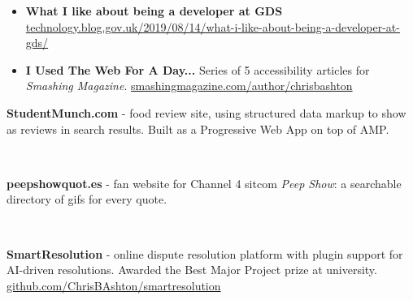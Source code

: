 \documentclass[10pt,a4paper,ragged2e,withhyper]{altacv}
\begin{document}
\begin{paracol}{2}
\vspace{\publicationspacer}
\begin{itemize}
    \item \textbf{What I like about being a developer at GDS} \newline \href{https://technology.blog.gov.uk/2019/08/14/what-i-like-about-being-a-developer-at-gds/}{\url{technology.blog.gov.uk/2019/08/14/what-i-like-about-being-a-developer-at-gds/}}

    \item \textbf{I Used The Web For A Day...}
    \newline Series of 5 accessibility articles for \emph{Smashing Magazine}.
    \newline
    \href{https://www.smashingmagazine.com/author/chrisbashton/}{\url{smashingmagazine.com/author/chrisbashton}}
\end{itemize}

\newpage


\def\spacer{0.7cm}

\textbf{StudentMunch.com} - food review site, using structured data markup to show as reviews in search results. Built as a Progressive Web App on top of AMP.

\medskip

  \\

\vspace{\spacer}

\textbf{peepshowquot.es} - fan website for Channel 4 sitcom \emph{Peep Show}: a searchable directory of gifs for every quote.

\medskip

  \\

\vspace{\spacer}

\textbf{SmartResolution} - online dispute resolution platform with plugin support for AI-driven resolutions. Awarded the Best Major Project prize at university.
\newline
\href{https://github.com/ChrisBAshton/smartresolution}{\url{github.com/ChrisBAshton/smartresolution}}

\medskip


\end{paracol}
\end{document}
